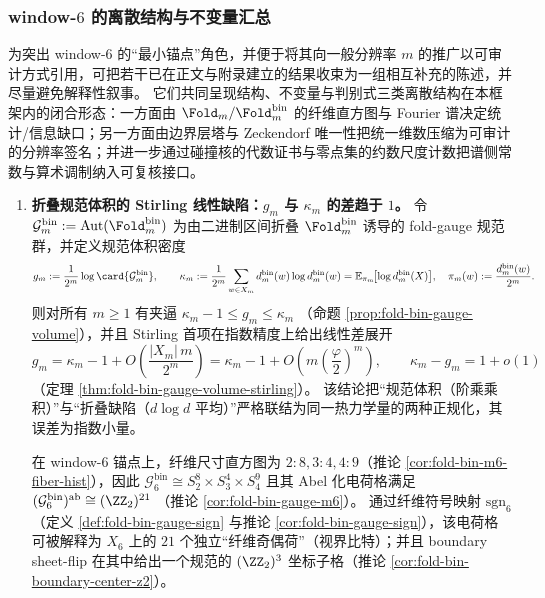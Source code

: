 \subsubsection{window-\texorpdfstring{\(6\)}{6} 的离散结构与不变量汇总}\label{subsubsec:window6-discrete-results}
为突出 window-\(6\) 的“最小锚点”角色，并便于将其向一般分辨率 \(m\) 的推广以可审计方式引用，可把若干已在正文与附录建立的结果收束为一组相互补充的陈述，并尽量避免解释性叙事。
它们共同呈现结构、不变量与判别式三类离散结构在本框架内的闭合形态：一方面由 \(\Fold_m/\Fold^{\mathrm{bin}}_m\) 的纤维直方图与 Fourier 谱决定统计/信息缺口；另一方面由边界层塔与 Zeckendorf 唯一性把统一维数压缩为可审计的分辨率签名；并进一步通过碰撞核的代数证书与零点集的约数尺度计数把谱侧常数与算术调制纳入可复核接口。

\begin{enumerate}
  \item \textbf{折叠规范体积的 Stirling 线性缺陷：\texorpdfstring{$g_m$}{gm} 与 \texorpdfstring{$\kappa_m$}{kappa} 的差趋于 \(1\)。}
  令
  \(\mathcal{G}^{\mathrm{bin}}_m:=\mathrm{Aut}(\Fold^{\mathrm{bin}}_m)\)
  为由二进制区间折叠 \(\Fold^{\mathrm{bin}}_m\) 诱导的 fold-gauge 规范群，并定义规范体积密度
  \[
  g_m:=\frac{1}{2^m}\log\card{\mathcal{G}^{\mathrm{bin}}_m},
  \qquad
  \kappa_m
  :=\frac{1}{2^m}\sum_{w\in X_m}d^{\mathrm{bin}}_m(w)\log d^{\mathrm{bin}}_m(w)
  =\mathbb{E}_{\pi_m}\!\bigl[\log d^{\mathrm{bin}}_m(X)\bigr],
  \quad
  \pi_m(w):=\frac{d^{\mathrm{bin}}_m(w)}{2^m}.
  \]
  则对所有 \(m\ge 1\) 有夹逼
  \(
  \kappa_m-1\le g_m\le \kappa_m
  \)
  （命题 \ref{prop:fold-bin-gauge-volume}），并且 Stirling 首项在指数精度上给出线性差展开
  \[
  g_m=\kappa_m-1+O\!\left(\frac{|X_m|\,m}{2^m}\right)
  =\kappa_m-1+O\!\left(m\left(\frac{\varphi}{2}\right)^m\right),
  \qquad
  \kappa_m-g_m=1+o(1)
  \]
  （定理 \ref{thm:fold-bin-gauge-volume-stirling}）。
  该结论把“规范体积（阶乘乘积）”与“折叠缺陷（\(d\log d\) 平均）”严格联结为同一热力学量的两种正规化，其误差为指数小量。

  
  \par
  在 window-\(6\) 锚点上，纤维尺寸直方图为 \(2:8,3:4,4:9\)（推论 \ref{cor:fold-bin-m6-fiber-hist}），因此
  \(
  \mathcal{G}^{\mathrm{bin}}_6\cong S_{2}^{8}\times S_{3}^{4}\times S_{4}^{9}
  \)
  且其 Abel 化电荷格满足
  \(
  (\mathcal{G}^{\mathrm{bin}}_6)^{\mathrm{ab}}\cong (\ZZ_2)^{21}
  \)
  （推论 \ref{cor:fold-bin-gauge-m6}）。
  通过纤维符号映射 \(\mathrm{sgn}_6\)（定义 \ref{def:fold-bin-gauge-sign} 与推论 \ref{cor:fold-bin-gauge-sign}），该电荷格可被解释为 \(X_6\) 上的 \(21\) 个独立“纤维奇偶荷”（视界比特）；并且 boundary sheet-flip 在其中给出一个规范的 \((\ZZ_2)^3\) 坐标子格（推论 \ref{cor:fold-bin-boundary-center-z2}）。


\end{enumerate}

